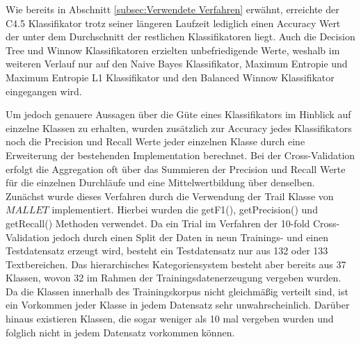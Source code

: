 Wie bereits in Abschnitt \ref{subsec:Verwendete Verfahren} erwähnt, erreichte der C4.5 Klassifikator trotz seiner längeren Laufzeit lediglich einen Accuracy Wert der unter dem Durchschnitt der restlichen Klassifikatoren liegt. Auch die Decision Tree und Winnow Klassifikatoren erzielten unbefriedigende Werte, weshalb im weiteren Verlauf nur auf den Naive Bayes Klassifikator, Maximum Entropie und Maximum Entropie L1 Klassifikator und den Balanced Winnow Klassifikator eingegangen wird.

Um jedoch genauere Aussagen über die Güte eines Klassifikators im Hinblick auf einzelne Klassen zu erhalten, wurden zusätzlich zur Accuracy jedes Klassifikators noch die Precision und Recall Werte jeder einzelnen Klasse durch eine Erweiterung der bestehenden Implementation berechnet. Bei der Cross-Validation erfolgt die Aggregation oft über das Summieren der Precision und Recall Werte für die einzelnen Durchläufe und eine Mittelwertbildung über denselben. Zunächst wurde dieses Verfahren durch die Verwendung der Trail Klasse von $MALLET$ implementiert. Hierbei wurden die getF1(), getPrecision() und getRecall() Methoden verwendet. Da ein Trial im Verfahren der 10-fold Cross-Validation jedoch durch einen Split der Daten in neun Trainings- und einen Testdatensatz erzeugt wird, besteht ein Testdatensatz nur aus 132 oder 133 Textbereichen. Das hierarchisches Kategoriensystem besteht aber bereits aus 37 Klassen, wovon 32 im Rahmen der Trainingsdatenerzeugung vergeben wurden. Da die Klassen innerhalb des Trainingskorpus nicht gleichmäßig verteilt sind, ist ein Vorkommen jeder Klasse in jedem Datensatz sehr unwahrscheinlich. Darüber hinaus existieren Klassen, die sogar weniger als 10 mal vergeben wurden und folglich nicht in jedem Datensatz vorkommen können.



